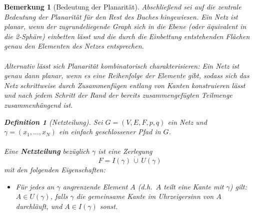 \documentclass[11pt,a4paper,leqno]{report}
\newtheorem{definition}[theorem]{Definition}
\newtheorem{remark}[theorem]{Bemerkung}
\numberwithin{equation}{chapter}
\begin{document}
\begin{remark}[Bedeutung der Planarität]

Abschließend sei auf die zentrale Bedeutung der Planarität für den Rest
des Buches hingewiesen. Ein Netz ist planar, wenn der zugrundeliegende
Graph sich in die Ebene (oder äquivalent in die 2-Sphäre) einbetten
lässt und die durch die Einbettung entstehenden Flächen genau den
Elementen des Netzes entsprechen. \\
\\
Alternativ lässt sich Planarität
kombinatorisch charakterisieren: Ein Netz ist genau dann planar, wenn
es eine Reihenfolge der Elemente gibt, sodass sich das Netz schrittweise
durch Zusammenfügen entlang von Kanten konstruieren lässt und nach
jedem Schritt der Rand der bereits zusammengefügten Teilmenge
zusammenhängend ist.
\begin{definition}[Netzteilung]
	Sei \(G=(V,E,F,p,q)\) ein  Netz und
	\(\gamma=(x_1,\dots,x_N)\) ein einfach geschlossener Pfad in \(G\).\\
	\\
	Eine \textbf{Netzteilung} bezüglich \(\gamma\) ist eine Zerlegung
	\[
	F = I(\gamma) \,\dot\cup\, U(\gamma)
	\]
	mit den folgenden Eigenschaften:
	\begin{itemize}
		\item Für jedes an \(\gamma\) angrenzende Element \(A\) (d.h.\ \(A\) teilt
		eine Kante mit \(\gamma\)) gilt:
		\(A\in U(\gamma)\), falls \(\gamma\) die gemeinsame Kante im Uhrzeigersinn
		von \(A\) durchläuft, und \(A\in I(\gamma)\) sonst.
		

\end{itemize}
\end{definition}
\end{remark}
\end{document}
